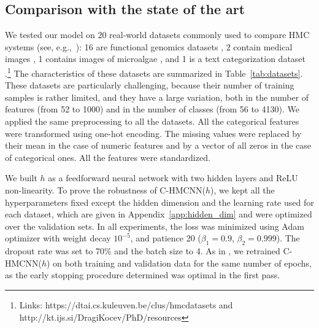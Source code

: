 \documentclass{article}
\newcommand{\system}[1]{C-HMCNN(#1)}
\begin{document}
\subsection{Comparison with the state of the art}



We tested our model on 20 real-world datasets commonly used to compare HMC systems (see, e.g.,~\cite{kwok2011,nakano2019,vens2008,cerri2018}): 16 are functional genomics datasets \citep{clare2003}, 2 contain medical images \citep{dimitrovski2008}, 1 contains images of microalgae \citep{dimitrovski2011}, and 1 is a text categorization dataset  \citep{klimt2004}.\footnote{Links: https://dtai.cs.kuleuven.be/clus/hmcdatasets and http://kt.ijs.si/DragiKocev/PhD/resources}
The characteristics of these datasets are summarized in Table~\ref{tab:datasets}. These datasets are particularly challenging,  because their number of training samples is rather limited, and they have a large variation, both in the number of features (from 52 to 1000) and in the number of classes (from 56 to 4130). We applied the same preprocessing  to all the datasets. All the categorical features were transformed using one-hot encoding. The missing values were replaced by their mean in the case of numeric features and by a vector of all zeros in the case of categorical ones. All the features were standardized. 


We built $h$ as a feedforward neural network with two 
hidden layers and ReLU non-linearity.
 To prove the robustness of \system{$h$},
 we kept all the hyperparameters fixed except the hidden dimension and the learning rate used for each dataset, which are given in Appendix~\ref{app:hidden_dim} and were optimized over the validation sets. In all experiments, the loss was minimized using Adam optimizer with weight decay $10^{-5}$, and patience 20 ($\beta_1 = 0.9$, $\beta_2 = 0.999$). The dropout rate was set to 70\% and the batch size to 4. 
As in \citep{cerri2018}, we retrained \system{$h$} on both training and validation data for the same number of epochs, as the early stopping procedure determined was optimal in the first pass.
\end{document}
